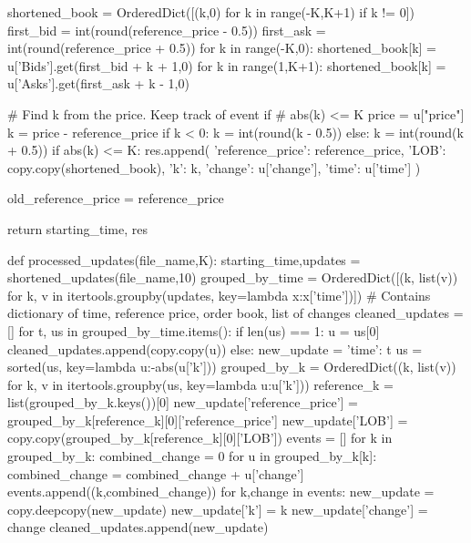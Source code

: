         shortened_book = OrderedDict([(k,0) for k in range(-K,K+1) if k != 0])
        first_bid = int(round(reference_price - 0.5))
        first_ask = int(round(reference_price + 0.5))        
        for k in range(-K,0):
            shortened_book[k] = u['Bids'].get(first_bid + k + 1,0)
        for k in range(1,K+1):
            shortened_book[k] = u['Asks'].get(first_ask + k - 1,0)
            
        # Find k from the price. Keep track of event if
        # abs(k) <= K
        price = u["price"]
        k = price - reference_price
        if k < 0:
            k = int(round(k - 0.5))
        else:
            k = int(round(k + 0.5))
        if abs(k) <= K:                 
            res.append({
                'reference_price': reference_price,
                'LOB': copy.copy(shortened_book),
                'k': k,
                'change': u['change'],
                'time': u['time']
            })
        
        old_reference_price = reference_price

    return starting_time, res
    
def processed_updates(file_name,K):
    starting_time,updates = shortened_updates(file_name,10)
    grouped_by_time = OrderedDict([(k, list(v)) for k, v in itertools.groupby(updates, key=lambda x:x['time'])])
    # Contains dictionary of time, reference price, order book, list of changes
    cleaned_updates = []
    for t, us in grouped_by_time.items():
        if len(us) == 1:
            u = us[0]
            cleaned_updates.append(copy.copy(u))
        else:
            new_update = {'time': t}
            us = sorted(us, key=lambda u:-abs(u['k']))
            grouped_by_k = OrderedDict((k, list(v)) for k, v in itertools.groupby(us, key=lambda u:u['k']))
            reference_k = list(grouped_by_k.keys())[0]
            new_update['reference_price'] = grouped_by_k[reference_k][0]['reference_price']
            new_update['LOB'] = copy.copy(grouped_by_k[reference_k][0]['LOB'])
            events = []
            for k in grouped_by_k:
                combined_change = 0
                for u in grouped_by_k[k]:
                    combined_change = combined_change + u['change']
                events.append((k,combined_change))
            for k,change in events:
                new_update = copy.deepcopy(new_update)
                new_update['k'] = k
                new_update['change'] = change
                cleaned_updates.append(new_update)
    
